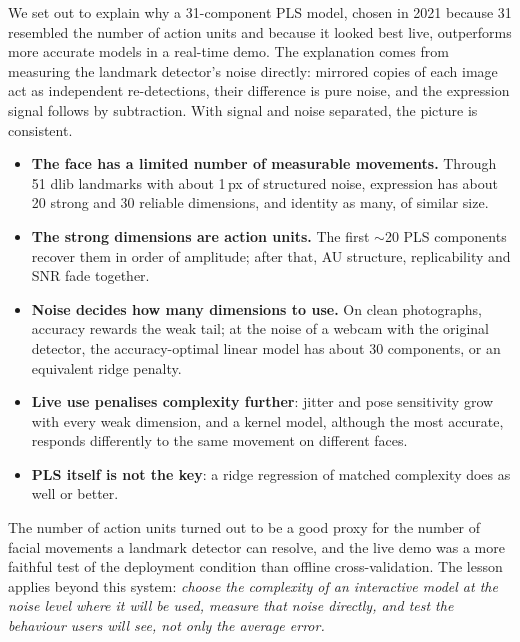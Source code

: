 \documentclass[11pt,a4paper]{article}
\begin{document}
We set out to explain why a 31-component PLS model, chosen in 2021 because 31 resembled the number
of action units and because it looked best live, outperforms more accurate models in a real-time
demo. The explanation comes from measuring the landmark detector's noise directly: mirrored copies
of each image act as independent re-detections, their difference is pure noise, and the expression
signal follows by subtraction. With signal and noise separated, the picture is consistent.
\begin{itemize}
  \item \textbf{The face has a limited number of measurable movements.} Through 51 dlib landmarks
  with about 1\,px of structured noise, expression has about 20 strong and 30 reliable dimensions,
  and identity as many, of similar size.
  \item \textbf{The strong dimensions are action units.} The first $\sim$20 PLS components recover
  them in order of amplitude; after that, AU structure, replicability and SNR fade together.
  \item \textbf{Noise decides how many dimensions to use.} On clean photographs, accuracy rewards
  the weak tail; at the noise of a webcam with the original detector, the accuracy-optimal linear
  model has about 30 components, or an equivalent ridge penalty.
  \item \textbf{Live use penalises complexity further}: jitter and pose sensitivity grow with every
  weak dimension, and a kernel model, although the most accurate, responds differently to the same
  movement on different faces.
  \item \textbf{PLS itself is not the key}: a ridge regression of matched complexity does as well
  or better.
\end{itemize}
The number of action units turned out to be a good proxy for the number of facial movements a
landmark detector can resolve, and the live demo was a more faithful test of the deployment
condition than offline cross-validation. The lesson applies beyond this system: \emph{choose the
complexity of an interactive model at the noise level where it will be used, measure that noise
directly, and test the behaviour users will see, not only the average error.}



\end{document}
